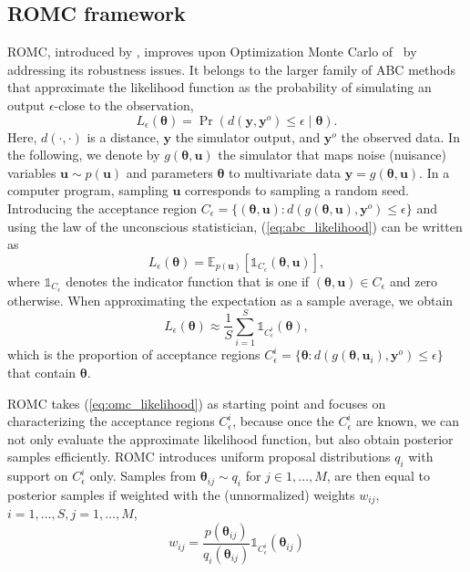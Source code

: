 \documentclass[twoside]{article}
\newlength{\secvspace}
\newlength{\subsecvspace}
\newcommand{\thb}{\boldsymbol{\theta}}
\newcommand{\ub}{\mathbf{u}}
\newcommand{\yb}{\mathbf{y}}
\newcommand{\data}{\mathbf{y}^o}
\newcommand{\accregioni}{C_{\epsilon}^i}
\newcommand{\E}{\mathbb{E}}
\begin{document}
\subsection{ROMC framework}
\vspace{\subsecvspace}
\label{subsec:ROMC}
ROMC, introduced by \citet{ikonomov2020robust}, improves upon Optimization Monte Carlo of~\citet{meeds2015optimization} by addressing its robustness issues. 
It belongs to the larger family of ABC methods that approximate the likelihood function as the probability of simulating an output $\epsilon$-close to the observation,
\begin{equation}
L_\epsilon(\thb) = \Pr(d(\yb, \data) \leq \epsilon \mid \thb).
\label{eq:abc_likelihood}
\end{equation}
Here, $d(\cdot, \cdot)$ is a distance, $\yb$ the simulator output, and $\data$ the observed data. In the following, we denote by $g(\thb, \ub)$ the simulator that maps noise (nuisance) variables $\ub \sim p(\ub)$ and parameters $\thb$ to multivariate data $\yb = g(\thb, \ub)$. 
In a computer program, sampling $\ub$ corresponds to sampling a random seed.
Introducing the acceptance region $C_\epsilon = \{(\thb, \ub): d(g(\thb, \ub), \data)\le \epsilon\}$ and using the law of the unconscious statistician, (\ref{eq:abc_likelihood}) can be written as
\begin{equation}
    L_\epsilon(\thb) = \E_{p(\ub)}\left[\mathbb{1}_{C_\epsilon}(\thb, \ub) \right],
\end{equation}
where $\mathbb{1}_{C_\epsilon}$ denotes the indicator function that is one if $(\thb, \ub)\in C_\epsilon$ and zero otherwise. When approximating the expectation as a sample average, we obtain
\begin{equation}
    L_\epsilon(\thb) \approx \frac{1}{S} \sum_{i=1}^S \mathbb{1}_{\accregioni}(\thb),
    \label{eq:omc_likelihood}
\end{equation}
which is the proportion of acceptance regions $\accregioni = \{\thb : d(g(\thb, \ub_i), \data) \leq \epsilon \}$ that contain $\thb$.

ROMC takes (\ref{eq:omc_likelihood}) as starting point and focuses on characterizing the acceptance regions $\accregioni$, because once the $\accregioni$ are known, we can not only evaluate the approximate likelihood function, but also obtain posterior samples efficiently. ROMC introduces uniform proposal distributions $q_i$ with support on $\accregioni$ only. Samples from $\thb_{ij} \sim q_i$ for $j \in 1,\ldots, M$, are then equal to posterior samples if weighted with the (unnormalized) weights $w_{ij}$, $i=1, \ldots, S, j=1, \ldots, M$,
\begin{equation}
w_{ij} = \frac{p(\thb_{ij})}{q_i(\thb_{ij})} \mathbb{1}_{C^i_{\epsilon}}(\thb_{ij}) \label{eq:romc_weight}
\end{equation}
\end{document}
